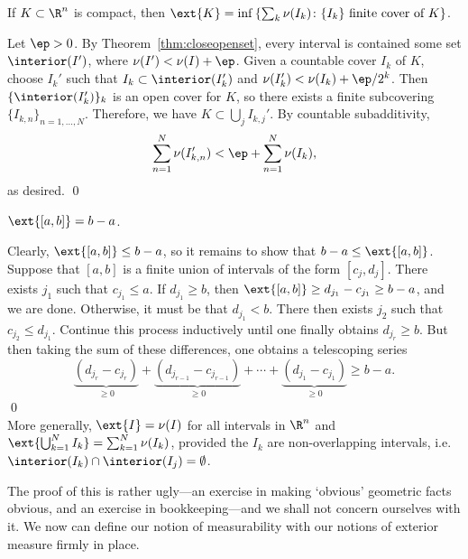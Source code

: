 \begin{lem} \label{lem:fincovcomset}
If $K \subset \R^n$ is compact, then $\ext{K}= \inf \left\{ \sum_k \nu(I_k) \colon \{I_k\} \text{ finite cover of }K \right\}$. 
\end{lem}

\pf Let $\ep>0$. By Theorem~\ref{thm:closeopenset}, every interval is contained some set $\interior(I')$, where $\nu(I')< \nu(I) + \ep$. Given a countable cover $I_k$ of $K$, choose $I_k'$ such that $I_k \subset \interior(I_k')$ and $\nu(I_k') < \nu(I_k) + \ep/2^k$. Then $\{\interior(I_k')\}_k$ is an open cover for $K$, so there exists a finite subcovering $\{I_{k,n}\}_{n=1,\ldots,N}$. Therefore, we have $K \subset \bigcup_j I_{k,j}'$. By countable subadditivity,
	\[
	\sum_{n=1}^N \nu(I_{k,n}') < \ep + \sum_{n=1}^N \nu(I_k),
	\]
as desired. \qed \\


\begin{prop}
$\ext{[a,b]}= b-a$. 
\end{prop}

\pf Clearly, $\ext{[a,b]} \leq b-a$, so it remains to show that $b-a \leq \ext{[a,b]}$. Suppose that $[a,b]$ is a finite union of intervals of the form $[c_j,d_j]$. There exists $j_1$ such that $c_{j_1} \leq a$. If $d_{j_1} \geq b$, then $\ext{[a,b]} \geq d_{j_1} - c_{j_1} \geq b-a$, and we are done. Otherwise, it must be that $d_{j_1} < b$. There then exists $j_2$ such that $c_{j_2} \leq d_{j_1}$. Continue this process inductively until one finally obtains $d_{j_r} \geq b$. But then taking the sum of these differences, one obtains a telescoping series
	\[
	\underbrace{(d_{j_{r}} - c_{j_{r}})}_{\geq 0} + \underbrace{(d_{j_{r-1}} - c_{j_{r-1}})}_{\geq 0} + \cdots + \underbrace{(d_{j_{1}} - c_{j_{1}})}_{\geq 0} \geq b-a.
	\]
\qed \\


More generally, $\ext{I} = \nu(I)$ for all intervals in $\R^n$ and $\ext{\bigcup_{k=1}^N I_k}= \sum_{k=1}^N \nu(I_k)$, provided the $I_k$ are non-overlapping intervals, i.e. $\interior(I_k) \cap \interior(I_j)= \emptyset$. 




\noindent The proof of this is rather ugly---an exercise in making `obvious' geometric facts obvious, and an exercise in bookkeeping---and we shall not concern ourselves with it. We now can define our notion of measurability with our notions of exterior measure firmly in place. 


